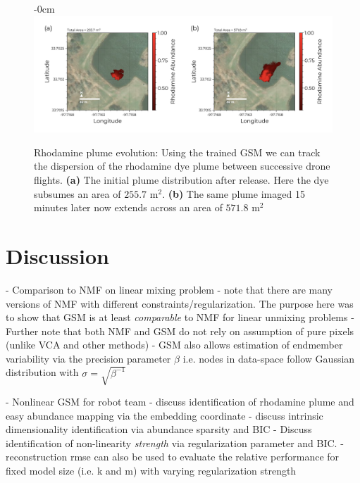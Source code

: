 \documentclass[remotesensing,article,submit,pdftex,moreauthors]{Definitions/mdpi}
\begin{document}
\begin{figure}[H]
\begin{adjustwidth}{-\extralength}{0cm}
\centering
\includegraphics[width=1.25\columnwidth]{results/robot-team/plume-evo.pdf}
\end{adjustwidth}
\caption{Rhodamine plume evolution: Using the trained GSM we can track the dispersion of the rhodamine dye plume between successive drone flights. \textbf{(a)} The initial plume distribution after release. Here the dye subsumes an area of $255.7$ $\text{m}^2$. \textbf{(b)} The same plume imaged 15 minutes later now extends across an area of $571.8$ $\text{m}^2$}
\label{fig:plume-evo}
\end{figure}  


\section{Discussion}\label{sec:disucssion}

- Comparison to NMF on linear mixing problem
    - note that there are many versions of NMF with different constraints/regularization. The purpose here was to show that GSM is at least \textit{comparable} to NMF for linear unmixing problems
    - Further note that both NMF and GSM do not rely on assumption of pure pixels (unlike VCA and other methods) 
    - GSM also allows estimation of endmember variability via the precision parameter $\beta$ i.e. nodes in data-space follow Gaussian distribution with $\sigma = \sqrt{\beta^{-1}}$

- Nonlinear GSM for robot team 
    - discuss identification of rhodamine plume and easy abundance mapping via the embedding coordinate
    - discuss intrinsic dimensionality identification via abundance sparsity and BIC
    - Discuss identification of non-linearity \textit{strength} via regularization parameter and BIC.
    - reconstruction rmse can also be used to evaluate the relative performance for fixed model size (i.e. k and m) with varying regularization strength
\end{document}

